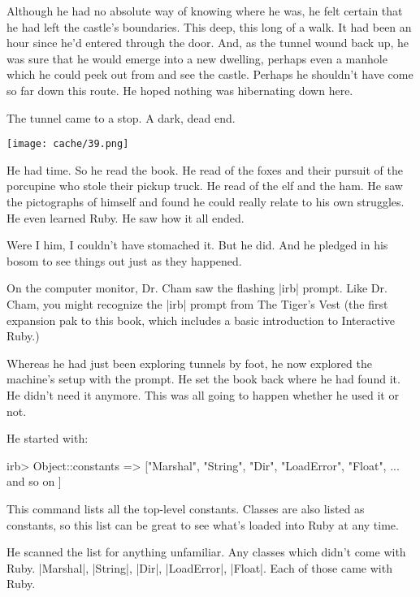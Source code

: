 \documentclass[12pt,twoside]{report}
\begin{document}
Although he had no absolute way of knowing where he was, he felt
certain that he had left the castle's boundaries.  This deep, this
long of a walk.  It had been an hour since he'd entered through the
door.  And, as the tunnel wound back up, he was sure that he would
emerge into a new dwelling, perhaps even a manhole which he could peek
out from and see the castle.  Perhaps he shouldn't have come so far
down this route.  He hoped nothing was hibernating down here.

The tunnel came to a stop.  A dark, dead end.

	\texttt{[image: cache/39.png]}

He had time.  So he read the book.  He read of the foxes and their
pursuit of the porcupine who stole their pickup truck.  He read of the
elf and the ham.  He saw the pictographs of himself and found he could
really relate to his own struggles.  He even learned Ruby.  He saw how
it all ended.

Were I him, I couldn't have stomached it.  But he did.  And he pledged
in his bosom to see things out just as they happened.

On the computer monitor, Dr. Cham saw the flashing
\rubyinline|irb| prompt.  Like Dr. Cham, you might
recognize the \rubyinline|irb| prompt from The Tiger's
Vest (the first expansion pak to this book, which includes a basic
introduction to Interactive Ruby.)

Whereas he had just been exploring tunnels by foot, he now explored
the machine's setup with the prompt.  He set the book back where he
had found it.  He didn't need it anymore.  This was all going to
happen whether he used it or not.

He started with:


\begin{consolecode}

 irb> Object::constants
   => ["Marshal", "String", "Dir", "LoadError", "Float", ... and so on ]

\end{consolecode}


This command lists all the top-level constants.  Classes are also
listed as constants, so this list can be great to see what's loaded
into Ruby at any time.

He scanned the list for anything unfamiliar.  Any classes which didn't
come with Ruby. \rubyinline|Marshal|,
\rubyinline|String|, \rubyinline|Dir|,
\rubyinline|LoadError|,
\rubyinline|Float|.  Each of those came with Ruby.
\end{document}
